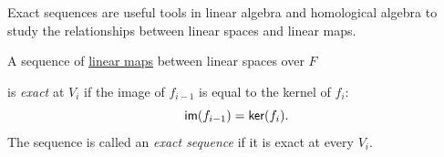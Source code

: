 Exact sequences are useful tools in linear algebra and homological algebra to study the relationships between linear spaces and linear maps.

\begin{definition}\label{def:exact_sequence}
  A sequence of \hyperref[def:linear_map]{linear maps} between linear spaces over $F$
  \begin{center}
  \end{center}
  is \emph{exact} at $V_i$ if the image of $f_{i-1}$ is equal to the kernel of $f_i$:
  \[
    \operatorname{\text{\normalfont\sffamily im}}(f_{i-1}) = \operatorname{\text{\normalfont\sffamily ker}}(f_i).
  \]
  The sequence is called an \emph{exact sequence} if it is exact at every $V_i$.
\end{definition}

